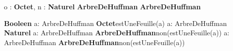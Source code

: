 \begin{algorithme}

    {o : \textbf{Octet}, n : \textbf{Naturel}}
    {\textbf{ArbreDeHuffman}}{}
     {\textbf{ArbreDeHuffman}}{}
    
    {\textbf{Booleen}}{}
    {a: ArbreDeHuffman}
    {\textbf{Octet}}{estUneFeuille(a)}
    {a: ArbreDeHuffman}
    {\textbf{Naturel}}{}
    {a: ArbreDeHuffman}
    {\textbf{ArbreDeHuffman}}{non(estUneFeuille(a))}
    {a: ArbreDeHuffman}
    {\textbf{ArbreDeHuffman}}{non(estUneFeuille(a))}
    
\end{algorithme}
